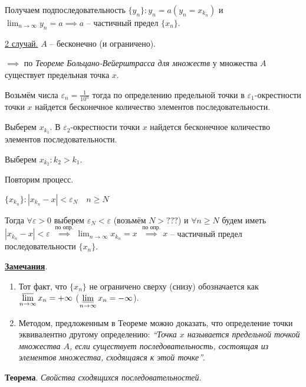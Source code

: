 \documentclass{article}
\begin{document}
Получаем подпоследовательность $\{y_n\}: y_n = a (y_n = x_{k_n})$ и
$\displaystyle\lim_{n \to \infty} y_n = a \implies a$ -- частичный предел $\{x_n\}$.

\underline{2 случай.} $A$ -- бесконечно (и ограничено).

$\implies$ по \textit{Теореме Больцано-Вейерштрасса для множеств} у множества $A$
существует предельная точка $x$.

Возьмём числа $\varepsilon_n = \frac{1}{10^n}$ тогда по определению предельной точки
в $\varepsilon_1$-окрестности точки $x$ найдется бесконечное количество элементов последовательности.

Выберем $x_{k_1}$. В $\varepsilon_2$-окрестности точки $x$ найдется бесконечное
количество элементов последовательности.

Выберем $x_{k_2}: k_2 > k_1$.

Повторим процесс.

$\{x_{k_n}\}: \left| x_{k_n} - x \right| < \varepsilon_N \quad n \ge N$

Тогда $\forall \varepsilon > 0$ выберем $\varepsilon_N < \varepsilon$
(возьмём $N > ???$) и $\forall n \ge N$ будем иметь 
$\left| x_{k_n} - x \right| < \varepsilon$ 
$\stackrel{\text{по опр.}}{\implies} \displaystyle\lim_{n \to \infty} x_{k_n} = x$
$\stackrel{\text{по опр.}}{\implies} x$ -- частичный предел последовательности $\{x_n\}$.

\underline{\textbf{Замечания}}.

\begin{enumerate}
    \item Тот факт, что $\{x_n\}$ не ограничено сверху (снизу) обозначается как 
    $\displaystyle\varlimsup_{n \to \infty} x_n = +\infty$ 
    ($\displaystyle\varliminf_{n \to \infty} x_n = -\infty$).

    \item Методом, предложенным в Теореме можно доказать, что определение точки
    эквивалентно другому определению: \textit{``Точка $x$ называется предельной точкой
    множества $A$, если существует последовательность, состоящая из элементов
    множества, сходящаяся к этой точке''}.
\end{enumerate}

\textbf{Теорема}. \textit{Свойства сходящихся последовательностей}.
\end{document}
